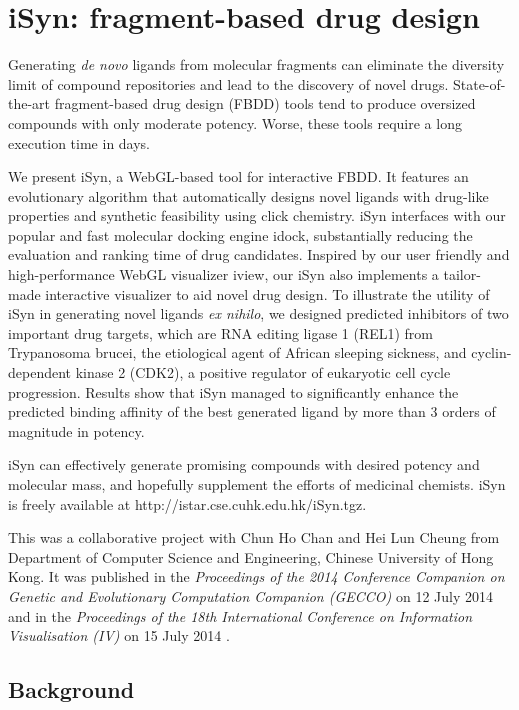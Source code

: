 \chapter{iSyn: fragment-based drug design}
\label{isyn}

Generating \textit{de novo} ligands from molecular fragments can eliminate the diversity limit of compound repositories and lead to the discovery of novel drugs. State-of-the-art fragment-based drug design (FBDD) tools tend to produce oversized compounds with only moderate potency. Worse, these tools require a long execution time in days.

We present iSyn, a WebGL-based tool for interactive FBDD. It features an evolutionary algorithm that automatically designs novel ligands with drug-like properties and synthetic feasibility using click chemistry. iSyn interfaces with our popular and fast molecular docking engine idock, substantially reducing the evaluation and ranking time of drug candidates. Inspired by our user friendly and high-performance WebGL visualizer iview, our iSyn also implements a tailor-made interactive visualizer to aid novel drug design. To illustrate the utility of iSyn in generating novel ligands \textit{ex nihilo}, we designed predicted inhibitors of two important drug targets, which are RNA editing ligase 1 (REL1) from Trypanosoma brucei, the etiological agent of African sleeping sickness, and cyclin-dependent kinase 2 (CDK2), a positive regulator of eukaryotic cell cycle progression. Results show that iSyn managed to significantly enhance the predicted binding affinity of the best generated ligand by more than 3 orders of magnitude in potency.

iSyn can effectively generate promising compounds with desired potency and molecular mass, and hopefully supplement the efforts of medicinal chemists. iSyn is freely available at http://istar.cse.cuhk.edu.hk/iSyn.tgz.

This was a collaborative project with Chun Ho Chan and Hei Lun Cheung from Department of Computer Science and Engineering, Chinese University of Hong Kong. It was published in the \textit{Proceedings of the 2014 Conference Companion on Genetic and Evolutionary Computation Companion (GECCO)} on 12 July 2014 \citep{1409} and in the \textit{Proceedings of the 18th International Conference on Information Visualisation (IV)} on 15 July 2014 \citep{1387}.

\section{Background}

